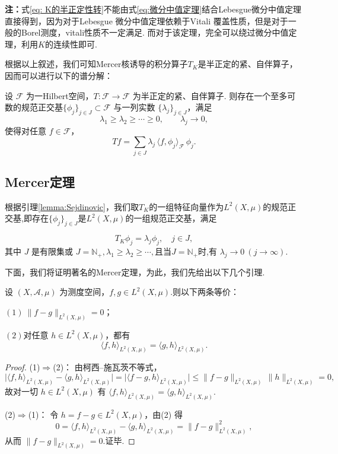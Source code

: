 \documentclass[../master.tex]{subfiles}
\begin{document}
\textbf{注：}式\eqref{eq: K的半正定性转}不能由式\eqref{eq:微分中值定理}结合Lebesgue微分中值定理直接得到，因为对于Lebesgue 微分中值定理依赖于Vitali 覆盖性质，但是对于一般的Borel测度，vitali性质不一定满足. 而对于该定理，完全可以绕过微分中值定理，利用$K$的连续性即可.


根据以上叙述，我们可知Mercer核诱导的积分算子$T_K$是半正定的紧、自伴算子，因而可以进行以下的谱分解：
\begin{lemma}\label{lemma:Sejdinovic}
设 $\mathcal{F}$ 为一Hilbert空间，$T:\mathcal{F}\to\mathcal{F}$ 为半正定的紧、自伴算子.
则存在一个至多可数的规范正交基$\{\phi_j\}_{j\in J}\subset\mathcal{F}$ 与一列实数
$\{\lambda_j\}_{j\in J}$，满足
\[
\lambda_1\ge \lambda_2\ge \cdots \geq  0,\qquad \lambda_j\to 0,
\]
使得对任意 $f\in\mathcal{F}$，
\[
Tf=\sum_{j\in J}\lambda_j\,\langle f,\phi_j\rangle_{\mathcal{F}}\,\phi_j .
\]
\end{lemma}


\subsection{Mercer定理}
根据引理\ref{lemma:Sejdinovic}，我们取$T_K$的一组特征向量作为$L^2(X,\mu)$的规范正交基,即存在$\{\phi_j\}_{j\in J}$是$L^2(X,\mu)$的一组规范正交基，满足

$$T_K\phi_j=\lambda_j\phi_j,\quad j\in J,$$
其中 $J$ 是有限集或 $J=\mathbb{N}_+,\lambda_1\geq\lambda_2\geq\cdots,$且当$J=\mathbb{N}_+$时,有 $\lambda_j\to0~(j\to\infty).$

下面，我们将证明著名的Mercer定理，为此，我们先给出以下几个引理.
\begin{lemma}[$L^2$意义下相等的等价性]\label{lemma: L2中等价性}
    设 $(X,\mathcal{A},\mu)$ 为测度空间，$f,g\in L^2(X,\mu)$.则以下两条等价：

$(1)~\|f-g\|_{L^2(X,\mu)}=0$；

$(2)$对任意 $h\in L^2(X,\mu)$，都有
    \[
        \langle f,h\rangle_{L^2(X,\mu)}=\langle g,h\rangle_{L^2(X,\mu)}.
    \]


\end{lemma}
\begin{proof}
(1)$\Rightarrow$(2)：
由柯西–施瓦茨不等式，
\[
\big|\langle f,h\rangle_{L^2(X,\mu)}-\langle g,h\rangle_{L^2(X,\mu)}\big|
=\big|\langle f-g,h\rangle_{L^2(X,\mu)}\big|
\le \|f-g\|_{L^2(X,\mu)}\,\|h\|_{L^2(X,\mu)}=0,
\]
故对一切 $h\in L^2(X,\mu)$ 有 $\langle f,h\rangle_{L^2(X,\mu)}=\langle g,h\rangle_{L^2(X,\mu)}$.

(2)$\Rightarrow$(1)：
令 $h=f-g\in L^2(X,\mu)$，由(2) 得
\[
0=\langle f,h\rangle_{L^2(X,\mu)}-\langle g,h\rangle_{L^2(X,\mu)}=\|f-g\|_{L^2(X,\mu)}^2,
\]
从而 $\|f-g\|_{L^2(X,\mu)}=0$.证毕.
\end{proof}
\end{document}

